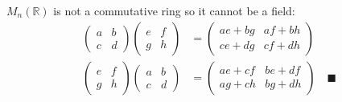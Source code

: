 \documentclass[12pt]{article}
\newcommand{\R}{\mathbb{R}}
\newcommand{\qed}{\quad \blacksquare}
\begin{document}
\begin{enumerate}[label=(\alph*)]
        \color{blue}
            $M_n(\R)$ is not a commutative ring so it cannot be a field:
            \begin{align*}
                \begin{pmatrix}
                    a & b\\
                    c & d
                \end{pmatrix}\begin{pmatrix}
                    e & f\\
                    g & h
                \end{pmatrix} &= \begin{pmatrix}
                    ae + bg & af + bh\\
                    ce + dg & cf + dh
                \end{pmatrix}\\
                \begin{pmatrix}
                    e & f\\
                    g & h
                \end{pmatrix} \begin{pmatrix}
                    a & b\\
                    c & d
                \end{pmatrix} &= \begin{pmatrix}
                    ae + cf & be + df\\
                    ag + ch & bg + dh
                \end{pmatrix} \qed
            \end{align*}
        \color{black}
    \end{enumerate}
\pagebreak
\end{document}
